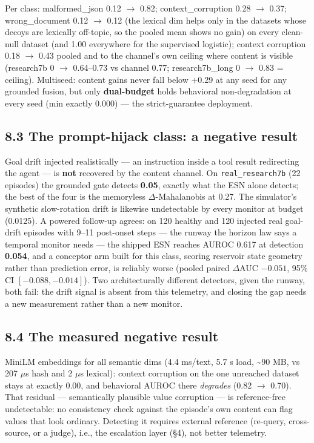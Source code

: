 \documentclass[11pt]{article}
\begin{document}
Per class: malformed\_json 0.12 $\rightarrow$ 0.82; context\_corruption 0.28 $\rightarrow$ 0.37; wrong\_document 0.12 $\rightarrow$ 0.12 (the lexical dim helps only in the datasets whose decoys are lexically off-topic, so the pooled mean shows no gain) on every clean-null dataset (and 1.00 everywhere for the supervised logistic); context corruption 0.18 $\rightarrow$ 0.43 pooled and to the channel's own ceiling where content is visible (research7b 0 $\rightarrow$ 0.64--0.73 vs channel 0.77; research7b\_long 0 $\rightarrow$ 0.83 = ceiling). Multiseed: content gains never fall below +0.29 at any seed for any grounded fusion, but only \textbf{dual-budget} holds behavioral non-degradation at every seed (min exactly 0.000) --- the strict-guarantee deployment.


\subsection{8.3 The prompt-hijack class: a negative result}


Goal drift injected realistically --- an instruction inside a tool result redirecting the agent --- is \textbf{not} recovered by the content channel. On \texttt{real\_\allowbreak{}research7b} (22 episodes) the grounded gate detects \textbf{0.05}, exactly what the ESN alone detects; the best of the four is the memoryless $\Delta$-Mahalanobis at 0.27. The simulator's synthetic slow-rotation drift is likewise undetectable by every monitor at budget (0.0125). A powered follow-up agrees: on 120 healthy and 120 injected real goal-drift episodes with 9--11 post-onset steps --- the runway the horizon law says a temporal monitor needs --- the shipped ESN reaches AUROC 0.617 at detection \textbf{0.054}, and a conceptor arm built for this class, scoring reservoir state geometry rather than prediction error, is reliably worse (pooled paired $\Delta$AUC $-0.051$, 95\% CI $[-0.088, -0.014]$). Two architecturally different detectors, given the runway, both fail: the drift signal is absent from this telemetry, and closing the gap needs a new measurement rather than a new monitor.


\subsection{8.4 The measured negative result}


MiniLM embeddings for all semantic dims (4.4 ms/text, 5.7 s load, \textasciitilde{}90 MB, vs 207 $\mu$s hash and 2 $\mu$s lexical): context corruption on the one unreached dataset stays at exactly 0.00, and behavioral AUROC there \emph{degrades} (0.82 $\rightarrow$ 0.70). That residual --- semantically plausible value corruption --- is reference-free undetectable: no consistency check against the episode's own content can flag values that look ordinary. Detecting it requires external reference (re-query, cross-source, or a judge), i.e., the escalation layer (\S{}4), not better telemetry.
\end{document}
